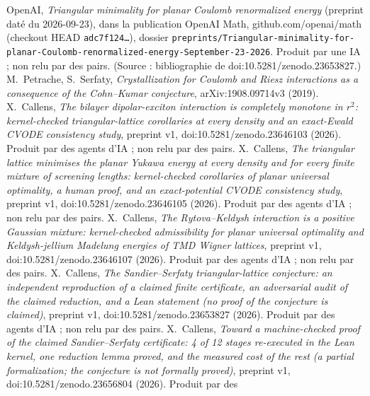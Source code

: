  OpenAI, \emph{Triangular minimality for planar Coulomb renormalized energy} (preprint daté du
2026-09-23), dans la publication OpenAI Math, github.com/openai/math (checkout HEAD \texttt{adc7f124\ldots}), dossier
\texttt{preprints/Triangular-minimality-for-planar-Coulomb-}\allowbreak\texttt{renormalized-energy-September-23-2026}. Produit par une IA ;
non relu par des pairs. (Source : bibliographie de doi\string:10.5281/zenodo.23653827.)
 M.~Petrache, S.~Serfaty, \emph{Crystallization for Coulomb and Riesz interactions as a consequence of the
Cohn--Kumar conjecture}, arXiv:1908.09714v3 (2019).
 X.~Callens, \emph{The bilayer dipolar-exciton interaction is completely monotone in $r^2$:
kernel-checked triangular-lattice corollaries at every density and an exact-Ewald CVODE consistency study}, preprint v1,
doi\string:10.5281/zenodo.23646103 (2026). Produit par des agents d'IA ; non relu par des pairs.
 X.~Callens, \emph{The triangular lattice minimises the planar Yukawa energy at every density and for every finite mixture of screening lengths: kernel-checked corollaries of planar universal optimality, a human proof, and an exact-potential CVODE consistency study}, preprint v1,
doi\string:10.5281/zenodo.23646105 (2026). Produit par des agents d'IA ; non relu par des pairs.
 X.~Callens, \emph{The Rytova--Keldysh interaction is a positive Gaussian mixture: kernel-checked
admissibility for planar universal optimality and Keldysh-jellium Madelung energies of TMD Wigner lattices}, preprint v1,
doi\string:10.5281/zenodo.23646107 (2026). Produit par des agents d'IA ; non relu par des pairs.
 X.~Callens, \emph{The Sandier--Serfaty triangular-lattice conjecture: an independent reproduction of a
claimed finite certificate, an adversarial audit of the claimed reduction, and a Lean statement (no proof of the
conjecture is claimed)}, preprint v1, doi\string:10.5281/zenodo.23653827 (2026). Produit par des agents d'IA ; non relu par des
pairs.
 X.~Callens, \emph{Toward a machine-checked proof of the claimed Sandier--Serfaty certificate: 4 of 12
stages re-executed in the Lean kernel, one reduction lemma proved, and the measured cost of the rest (a partial
formalization; the conjecture is not formally proved)}, preprint v1, doi\string:10.5281/zenodo.23656804 (2026). Produit par des
